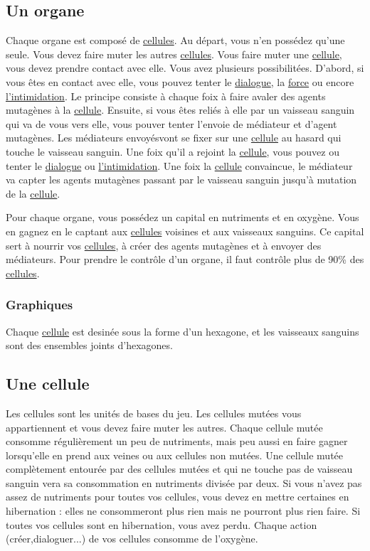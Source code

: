\documentclass{article}
\begin{document}
\subsection{Un organe}\label{organe}
Chaque organe est composé de \hyperref[cellule]{cellules}. Au départ, vous n'en possédez qu'une seule. Vous devez faire muter les autres \hyperref[cellule]{cellules}. Vous faire muter une \hyperref[cellule]{cellule}, vous devez prendre contact avec elle. Vous avez plusieurs possibilitées. D'abord, si vous êtes en contact avec elle, vous pouvez tenter le \hyperref[dialogue]{dialogue}, la \hyperref[force]{force} ou encore \hyperref[intimi]{l'intimidation}. Le principe consiste à chaque foix à faire avaler des agents mutagènes à la \hyperref[cellule]{cellule}. Ensuite, si vous êtes reliés à elle par un vaisseau sanguin qui va de vous vers elle, vous pouver tenter l'envoie de médiateur et d'agent mutagènes. Les médiateurs envoyésvont se fixer sur une \hyperref[cellule]{cellule} au hasard qui touche le vaisseau sanguin. Une foix qu'il a rejoint la \hyperref[cellule]{cellule}, vous pouvez ou tenter le \hyperref[dialogue]{dialogue} ou \hyperref[intimi]{l'intimidation}. Une foix la \hyperref[cellule]{cellule} convaincue, le médiateur va capter les agents mutagènes passant par le vaisseau sanguin jusqu'à mutation de la \hyperref[cellule]{cellule}.

Pour chaque organe, vous possédez un capital en nutriments et en oxygène. Vous en gagnez en le captant aux \hyperref[cellule]{cellules} voisines et aux vaisseaux sanguins. Ce capital sert à nourrir vos \hyperref[cellule]{cellules}, à créer des agents mutagènes et à envoyer des médiateurs. Pour prendre le contrôle d'un organe, il faut contrôle plus de 90\% des \hyperref[cellule]{cellules}.

\subsubsection{Graphiques}
Chaque \hyperref[cellule]{cellule} est desinée sous la forme d'un hexagone, et les vaisseaux sanguins sont des ensembles joints d'hexagones.

\subsection{Une cellule}\label{cellule}
Les cellules sont les unités de bases du jeu. Les cellules mutées vous appartiennent et vous devez faire muter les autres. Chaque cellule mutée consomme régulièrement un peu de nutriments, mais peu aussi en faire gagner lorsqu'elle en prend aux veines ou aux cellules non mutées. Une cellule mutée complètement entourée par des cellules mutées et qui ne touche pas de vaisseau sanguin vera sa consommation en nutriments divisée par deux. Si vous n'avez pas assez de nutriments pour toutes vos cellules, vous devez en mettre certaines en hibernation : elles ne consommeront plus rien mais ne pourront plus rien faire. Si toutes vos cellules sont en hibernation, vous avez perdu. Chaque action (créer,dialoguer...) de vos cellules consomme de l'oxygène.
\end{document}
